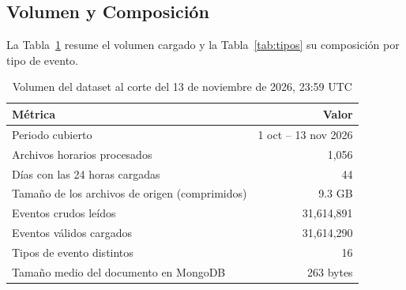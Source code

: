 \subsection{Volumen y Composición}

La Tabla~\ref{tab:volumen} resume el volumen cargado y la Tabla~\ref{tab:tipos} su composición por tipo de evento.

\begin{table}[H]
\centering
\caption{Volumen del dataset al corte del 13 de noviembre de 2026, 23:59 UTC}
\label{tab:volumen}
\vspace{0.2cm}
\small
\begin{tabular}{@{}lr@{}}
\toprule
\textbf{Métrica} & \textbf{Valor} \\
\midrule
Periodo cubierto                         & 1 oct -- 13 nov 2026 \\
Archivos horarios procesados             & 1,056 \\
Días con las 24 horas cargadas           & 44 \\
Tamaño de los archivos de origen (comprimidos) & 9.3 GB \\
Eventos crudos leídos                    & 31,614,891 \\
Eventos válidos cargados                 & 31,614,290 \\
Tipos de evento distintos                & 16 \\
Tamaño medio del documento en MongoDB    & 263 bytes \\
\bottomrule
\end{tabular}
\end{table}

